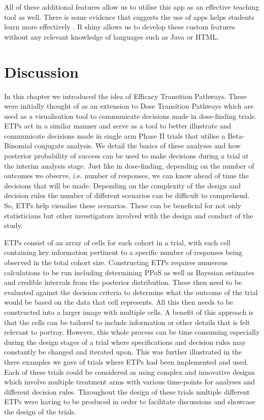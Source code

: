 All of these additional features allow us to utilise this app as an effective teaching tool as well. There is some evidence that suggests the use of apps helps students learn more effectively \cite{doiWebApplicationTeaching2016}. R shiny allows us to develop these custom features without any relevant knowledge of languages such as Java or HTML. 


\section{Discussion}

In this chapter we introduced the idea of Efficacy Transition Pathways. These were initially thought of as an extension to Dose Transition Pathways which are used as a visualisation tool to communicate decisions made in dose-finding trials. ETPs act in a similar manner and serve as a tool to better illustrate and communicate decisions made in single arm Phase \RN{2} trials that utilise a Beta-Binomial conjugate analysis. We detail the basics of these analyses and how posterior probability of success can be used to make decisions during a trial at the interim analysis stage. Just like in dose-finding, depending on the number of outcomes we observe, i.e. number of responses, we can know ahead of time the decisions that will be made. Depending on the complexity of the design and decision rules the number of different scenarios can be difficult to comprehend. So, ETPs help visualise these scenarios. These can be beneficial for not only statisticians but other investigators involved with the design and conduct of the study. 

ETPs consist of an array of cells for each cohort in a trial, with each cell containing key information pertinent to a specific number of responses being observed in the total cohort size. Constructing ETPs requires numerous calculations to be run including determining PPoS as well as Bayesian estimates and credible intervals from the posterior distribution. These then need to be evaluated against the decision criteria to determine what the outcome of the trial would be based on the data that cell represents. All this then needs to be constructed into a larger image with multiple cells. A benefit of this approach is that the cells can be tailored to include information or other details that is felt relevant to portray. However, this whole process can be time consuming especially during the design stages of a trial where specifications and decision rules may constantly be changed and iterated upon. This was further illustrated in the three examples we gave of trials where ETPs had been implemented and used. Each of these trials could be considered as using complex and innovative designs which involve multiple treatment arms with various time-points for analyses and different decision rules. Throughout the design of these trials multiple different ETPs were having to be produced in order to facilitate discussions and showcase the design of the trials. 


